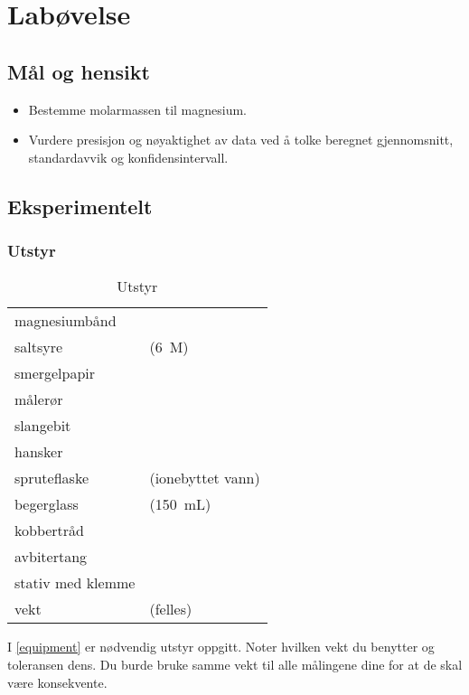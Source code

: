 	\clearpage
	\section{Labøvelse}
	
	\subsection{Mål og hensikt}
	\begin{itemize}
		\item Bestemme molarmassen til magnesium.
		
		\item Vurdere presisjon og nøyaktighet av data ved å tolke beregnet gjennomsnitt, standardavvik og konfidensintervall.
	\end{itemize}
	
	\subsection{Eksperimentelt}
	
	\subsubsection{Utstyr}
	
	\begin{table}[H]
		\caption{Utstyr}
		\begin{tabular}{ll}
			\toprule
			magnesiumbånd & \\ 
			saltsyre & (\SI{6}{M}) \\
			smergelpapir & \\
			målerør & \\
			slangebit & \\
			hansker & \\
			spruteflaske & (ionebyttet vann) \\
			begerglass & (\SI{150}{mL}) \\
			kobbertråd & \\
			avbitertang & \\ 
			stativ med klemme & \\ 
			vekt & (felles) \\ \bottomrule 
		\end{tabular}
		\label{equipment}
	\end{table}

	I \vref{equipment} er nødvendig utstyr oppgitt.	Noter hvilken vekt du benytter og toleransen dens. Du burde bruke samme vekt til alle målingene dine for at de skal være konsekvente.
	

